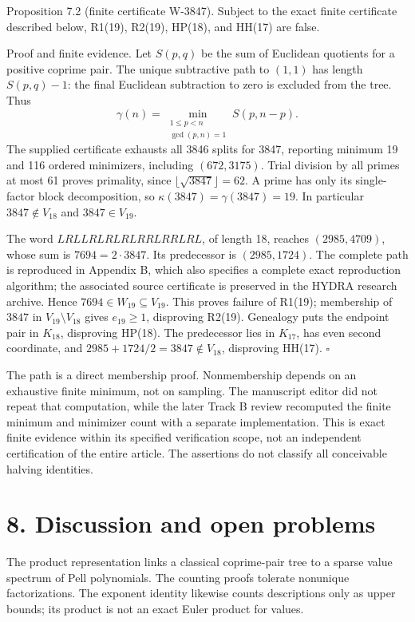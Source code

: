 \documentclass[11pt]{article}
\begin{document}
Proposition 7.2 (finite certificate W-3847). Subject to the exact finite certificate described below, R1(19), R2(19), HP(18), and HH(17) are false.

Proof and finite evidence. Let \(S(p,q)\) be the sum of Euclidean quotients for a positive coprime pair. The unique subtractive path to \((1,1)\) has length \(S(p,q)-1\): the final Euclidean subtraction to zero is excluded from the tree. Thus
\[
\gamma(n)=\min_{\substack{1\le p<n\\\gcd(p,n)=1}}S(p,n-p).
\]
The supplied certificate exhausts all 3846 splits for 3847, reporting minimum 19 and 116 ordered minimizers, including \((672,3175)\). Trial division by all primes at most 61 proves primality, since \(\lfloor\sqrt{3847}\rfloor=62\). A prime has only its single-factor block decomposition, so \(\kappa(3847)=\gamma(3847)=19\). In particular \(3847\notin V_{18}\) and \(3847\in V_{19}\).

The word \(LRLLRLRLRLRRLRRLRL\), of length 18, reaches \((2985,4709)\), whose sum is \(7694=2\cdot3847\). Its predecessor is \((2985,1724)\). The complete path is reproduced in Appendix B, which also specifies a complete exact reproduction algorithm; the associated source certificate is preserved in the HYDRA research archive. Hence \(7694\in W_{19}\subseteq V_{19}\). This proves failure of R1(19); membership of \(3847\) in \(V_{19}\setminus V_{18}\) gives \(e_{19}\ge1\), disproving R2(19). Genealogy puts the endpoint pair in \(K_{18}\), disproving HP(18). The predecessor lies in \(K_{17}\), has even second coordinate, and \(2985+1724/2=3847\notin V_{18}\), disproving HH(17). \(\square\)

The path is a direct membership proof. Nonmembership depends on an exhaustive finite minimum, not on sampling. The manuscript editor did not repeat that computation, while the later Track B review recomputed the finite minimum and minimizer count with a separate implementation. This is exact finite evidence within its specified verification scope, not an independent certification of the entire article. The assertions do not classify all conceivable halving identities.

\section*{8. Discussion and open problems}

The product representation links a classical coprime-pair tree to a sparse value spectrum of Pell polynomials. The counting proofs tolerate nonunique factorizations. The exponent identity likewise counts descriptions only as upper bounds; its product is not an exact Euler product for values.
\end{document}

